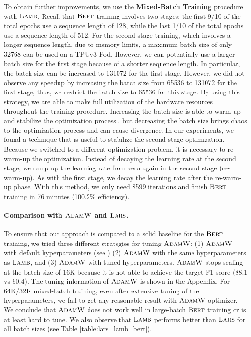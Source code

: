\documentclass{article} \usepackage{iclr2020_conference,times}
\newcommand{\bert}{\textsc{Bert}\xspace}
\newcommand{\adamw}{\textsc{AdamW}}
\newcommand{\lamb}{\textsc{Lamb}}
\newcommand{\lars}{\textsc{Lars}}
\begin{document}
To obtain further improvements, we use the {\bf Mixed-Batch Training} procedure with $\lamb$. 
Recall that $\bert$ training involves two stages: the first 9/10 of the total epochs use a sequence length of 128, while the last 1/10 of the total epochs use a sequence length of 512. 
For the second stage training, which involves a longer sequence length, due to memory limits, a maximum batch size of only 32768 can be used on a TPUv3 Pod. However, we can potentially use a larger batch size for the first stage because of a shorter sequence length. 
In particular, the batch size can be increased to 131072 for the first stage. 
However, we did not observe any speedup by increasing the batch size from 65536 to 131072 for the first stage, thus, we restrict the batch size to 65536 for this stage. 
By using this strategy, we are able to make full utilization of the hardware resources throughout the training procedure. 
Increasing the batch size is able to warm-up and stabilize the optimization process \citep{smith2017don}, but decreasing the batch size brings chaos to the optimization process and can cause divergence.
In our experiments, we found a technique that is useful to stabilize the second stage optimization.
Because we switched to a different optimization problem, it is necessary to re-warm-up the optimization.
Instead of decaying the learning rate at the second stage, we ramp up the learning rate from zero again in the second stage (re-warm-up).
As with the first stage, we decay the learning rate after the re-warm-up phase.
With this method, we only need 8599 iterations and finish $\bert$ training in 76 minutes (100.2\% efficiency).




\paragraph{Comparison with $\adamw$ and $\lars$.}
To ensure that our approach is compared to a solid baseline for the $\bert$ training, we tried three different strategies for tuning $\adamw$: (1) $\adamw$ with default hyperparameters (see \cite{devlin2018bert}) (2) $\adamw$ with the same hyperparameters as $\lamb$, and (3) $\adamw$ with tuned hyperparameters. $\adamw$ stops scaling at the batch size of 16K because it is not able to achieve the target F1 score (88.1 vs 90.4). 
The tuning information of $\adamw$ is shown in the Appendix.
For 64K/32K mixed-batch training, even after extensive tuning of the hyperparameters, we fail to get any reasonable result with $\adamw$ optimizer. 
We conclude that $\adamw$ does not work well in large-batch $\bert$ training or is at least hard to tune.
We also observe that $\lamb$ performs better than $\lars$ for all batch sizes (see Table \ref{table:lars_lamb_bert}).
\end{document}
